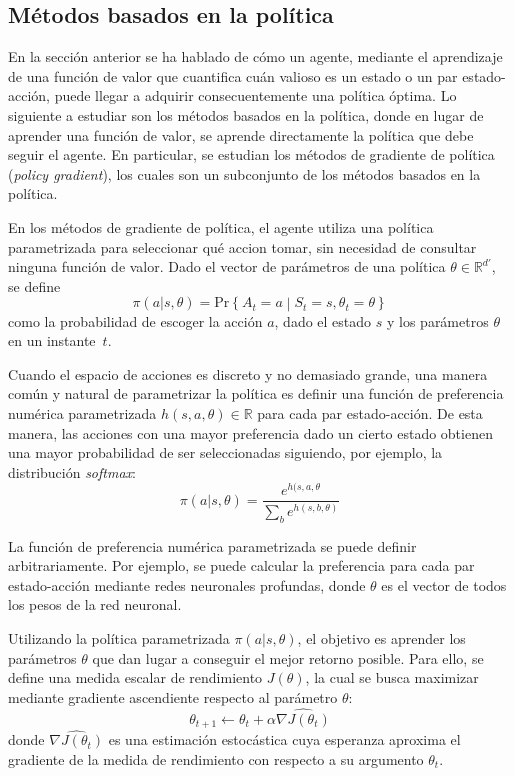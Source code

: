 \subsection{Métodos basados en la política}

En la sección anterior se ha hablado de cómo un agente, mediante el aprendizaje de una función de valor que cuantifica cuán valioso es un estado o un par estado-acción, puede llegar a adquirir consecuentemente una política óptima. Lo siguiente a estudiar son los métodos basados en la política, donde en lugar de aprender una función de valor, se aprende directamente la política que debe seguir el agente. En particular, se estudian los métodos de gradiente de política (\emph{policy gradient}), los cuales son un subconjunto de los métodos basados en la política.

En los métodos de gradiente de política, el agente utiliza una política parametrizada para seleccionar qué accion tomar, sin necesidad de consultar ninguna función de valor. Dado el vector de parámetros de una política $\theta \in \mathbb{R}^{d'}$, se define 
\begin{equation}
    \pi(a|s,\theta) = \text{Pr}\left\{A_t = a \middle| S_t = s, \theta_t = \theta\right\}
\end{equation}
como la probabilidad de escoger la acción $a$, dado el estado $s$ y los parámetros $\theta$ en un instante~$t$.

Cuando el espacio de acciones es discreto y no demasiado grande, una manera común y natural de parametrizar la política es definir una función de preferencia numérica parametrizada $h(s, a, \theta) \in \mathbb{R}$ para cada par estado-acción. De esta manera, las acciones con una mayor preferencia dado un cierto estado obtienen una mayor probabilidad de ser seleccionadas siguiendo, por ejemplo, la distribución \emph{softmax}:
\begin{equation}
    \pi(a|s,\theta) = \frac{e^{h(s,a,\theta}}{\sum_{b} e^{h(s,b,\theta)}}
\end{equation}

La función de preferencia numérica parametrizada se puede definir arbitrariamente. Por ejemplo, se puede calcular la preferencia para cada par estado-acción mediante redes neuronales profundas, donde $\theta$ es el vector de todos los pesos de la red neuronal.

Utilizando la política parametrizada $\pi(a|s,\theta)$, el objetivo es aprender los parámetros $\theta$ que dan lugar a conseguir el mejor retorno posible. Para ello, se define una medida escalar de rendimiento $J(\theta)$, la cual se busca maximizar mediante gradiente ascendiente respecto al parámetro $\theta$:
\begin{equation}
    \theta_{t+1} \leftarrow \theta_{t} + \alpha \widehat{\nabla J(\theta_t)}
\end{equation}
donde $\widehat{\nabla J(\theta_t)}$ es una estimación estocástica cuya esperanza aproxima el gradiente de la medida de rendimiento con respecto a su argumento $\theta_t$.

